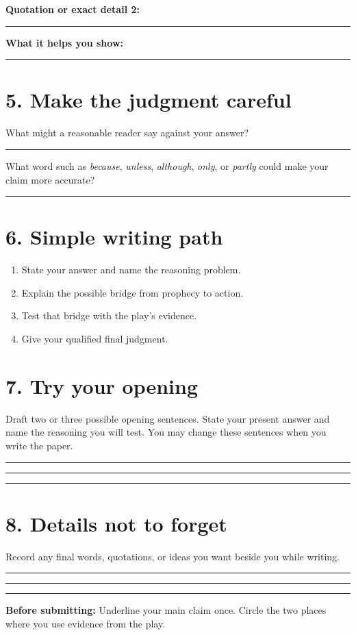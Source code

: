 \documentclass[11pt]{article}
\newcommand{\blankline}{\par\vspace{0.1em}\noindent\rule{\linewidth}{0.4pt}\par\vspace{0.35em}}
\begin{document}
\textbf{Quotation or exact detail 2:}
\blankline
\textbf{What it helps you show:}
\blankline

\newpage

\section*{5. Make the judgment careful}

What might a reasonable reader say against your answer?
\blankline

What word such as \emph{because}, \emph{unless}, \emph{although}, \emph{only}, or \emph{partly} could make your claim more accurate?
\blankline

\section*{6. Simple writing path}

\begin{enumerate}[leftmargin=1.55em,itemsep=0.15em]
\item State your answer and name the reasoning problem.
\item Explain the possible bridge from prophecy to action.
\item Test that bridge with the play's evidence.
\item Give your qualified final judgment.
\end{enumerate}

\section*{7. Try your opening}

Draft two or three possible opening sentences. State your present answer and name the reasoning you will test. You may change these sentences when you write the paper.
\blankline
\blankline
\blankline

\section*{8. Details not to forget}

Record any final words, quotations, or ideas you want beside you while writing.
\blankline
\blankline
\blankline

\textbf{Before submitting:} Underline your main claim once. Circle the two places where you use evidence from the play.
\end{document}
